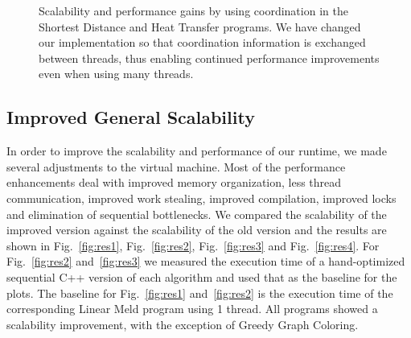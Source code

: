 \documentclass[10pt]{article}
\begin{document}
\begin{figure}[hb]
\begin{center}
\end{center}
\caption{Scalability and performance gains by using coordination in the Shortest
Distance and Heat Transfer programs. We have changed our implementation so that
coordination information is exchanged between threads, thus enabling
continued performance improvements even when using many threads.}
\label{fig:coord_others}
\end{figure}

\subsection{Improved General Scalability}

In order to improve the scalability and performance of our runtime, we made several adjustments
to the virtual machine. Most of the performance enhancements deal with improved
memory organization, less thread communication, improved work stealing, improved
compilation, improved locks and elimination of sequential bottlenecks. We
compared the scalability of the improved version against the scalability of the
old version and the results are shown in Fig.~\ref{fig:res1},
Fig.~\ref{fig:res2}, Fig.~\ref{fig:res3} and Fig.~\ref{fig:res4}. For
Fig.~\ref{fig:res2} and~\ref{fig:res3} we measured the execution time of a
hand-optimized sequential C++ version of each algorithm and used that as the
baseline for the plots. The baseline for Fig.~\ref{fig:res1}
and~\ref{fig:res2} is the execution time of the corresponding Linear Meld
program using 1 thread. All programs showed a scalability improvement, with the
exception of Greedy Graph Coloring.
\end{document}
